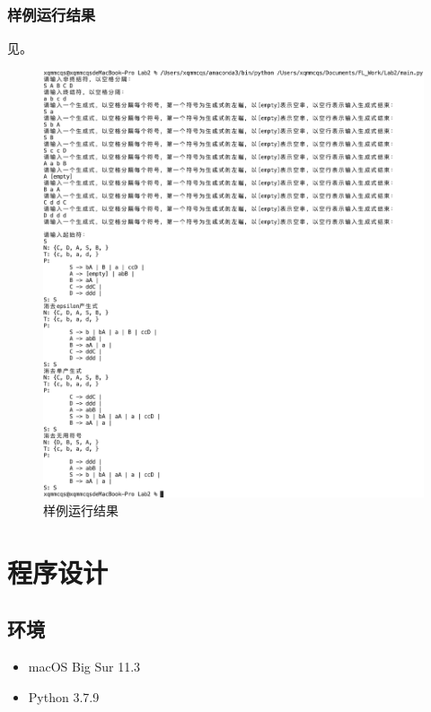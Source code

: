 \documentclass[lang=cn,11pt,a4paper,cite=authornum]{paper}
\begin{document}
\subsubsection{样例运行结果}

见。

\begin{figure}[htbp]

    \centering\includegraphics[width=\textwidth]{./Images/result.png}

    \caption{样例运行结果\label{fig:result}}

\end{figure}

\section{程序设计}

\subsection{环境}

\begin{itemize}
    \item macOS Big Sur 11.3
    \item Python 3.7.9
\end{itemize}
\end{document}
